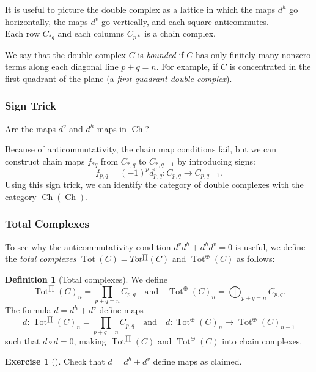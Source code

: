 \documentclass[reqno]{amsart}
\theoremstyle{definition}
\newtheorem{definition}[theorem]{Definition}
\newtheorem{exercise}[theorem]{Exercise}
\theoremstyle{remark}
\DeclareMathOperator{\Ch}{Ch}
\DeclareMathOperator{\Tot}{Tot}
\begin{document}
It is useful to picture the double complex as a lattice
in which the maps $d^{h}$ go horizontally, the maps
$d^{v}$ go vertically, and each square anticommutes.\\
\linebreak
Each row $C_{*q}$ and each
columns $C_{p*}$ is a chain complex.

We say that the double complex
$C$ is \textit{bounded} if $C$ has only finitely many
nonzero terms along each diagonal line
$p+q = n$.
For example, if $C$ is concentrated in the first quadrant of
the plane (a \textit{first quadrant double complex}).


\subsubsection{Sign Trick}

Are the maps
$d^{v}$ and $d^{h}$ maps in
$\Ch$?

Because of anticommutativity, the chain map conditions fail, but
we can construct chain maps
$f_{*q} $ from $C_{*,q}$ to $C_{*,q-1}$ by introducing signs:
\[
f_{p,q} = (-1)^{p} d_{p,q}^{v} \colon
C_{p,q} \to C_{p,q-1}.
\] 
Using this sign trick, we can identify the category of double
complexes with the category
$\Ch \left( \Ch \right) $.

\subsubsection{Total Complexes}

To see why the anticommutativity condition
$d^{v} d^{h} + d^{h} d^{v} = 0$ is useful,
we define the \textit{total complexes} 
$\Tot (C) = Tot^{\prod} (C)$ and
$\Tot^{\oplus} (C)$ as follows:

 \begin{definition}[Total complexes]
    We define
    \[
        \Tot^{\prod}(C)_n = 
        \prod_{p+q=n}C_{p,q} \quad
        \text{and} \quad
        \Tot^{\oplus} (C)_n = 
        \bigoplus_{p+q=n}C_{p,q}.
    \] 
    The formula $d = d^{h} + d^{v}$ define maps
    \[
        d \colon \Tot^{\prod} (C)_n = 
        \prod_{p+q = n} C_{p,q} \quad \text{and} \quad
        d \colon \Tot^{\oplus}(C)_n \to 
        \Tot^{\oplus} (C)_{n-1}
    \] 
    such that $d \circ d = 0$, making
    $\Tot^{\prod}(C)$ and
    $\Tot^{\oplus}(C)$ into chain complexes.
\end{definition}

\begin{exercise}[]
    Check that $d = d^{h} + d^{v}$ define maps as
    claimed.
\end{exercise}
\end{document}
